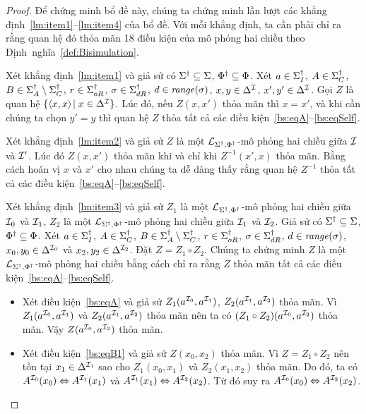 \begin{proof}
	Để chứng minh bổ đề này, chúng ta chứng minh lần lượt các khẳng định~\ref{lm:item1}--\ref{lm:item4} của bổ đề. Với mỗi khẳng định, ta cần phải chỉ ra rằng quan hệ đó thỏa mãn 18 điều kiện của mô phỏng hai chiều theo Định~nghĩa~\ref{def:Bisimulation}.
	
	\semiItem Xét khẳng định~\eqref{lm:item1} và giả sử có $\Sigma^\dag \subseteq \Sigma$, $\Phi^\dag \subseteq \Phi$. Xét $a \in \Sigma^\dag_I$, $A \in \Sigma^\dag_C$, $B \in \Sigma^\dag_A\setminus\Sigma^\dag_C$, $r \in \Sigma^\dag_{oR}$, $\sigma \in \Sigma^\dag_{dR}$, $d \in \mathit{range}(\sigma)$, $x,y \in \Delta^{\mathcal{I}}$, $x',y' \in \Delta^{\mathcal{I}}$.
	Gọi $Z$ là quan hệ $\{\left\langle x,x\right\rangle\! \mid x \in \Delta^{\mathcal{I}}\}$. Lúc đó, nếu $Z(x, x')$ thỏa mãn thì $x = x'$, và khi cần chúng ta chọn $y' = y$ thì quan hệ $Z$ thỏa tất cả các điều kiện~\eqref{bs:eqA}--\eqref{bs:eqSelf}.
	
	\semiItem Xét khẳng định~\eqref{lm:item2} và giả sử $Z$ là một $\mathcal{L}_{\Sigma^\dag,\Phi^\dag}$-mô phỏng hai chiều giữa $\mathcal{I}$ và $\mathcal{I}'$. Lúc đó $Z(x, x')$ thỏa mãn khi và chỉ khi $Z^{-1}(x', x)$ thỏa mãn. Bằng cách hoán vị $x$ và $x'$ cho nhau chúng ta dễ dàng thấy rằng quan hệ $Z^{-1}$ thỏa tất cả các điều kiện~\eqref{bs:eqA}--\eqref{bs:eqSelf}.
	
	\semiItem Xét khẳng định~\eqref{lm:item3} và giả sử $Z_1$ là một $\mathcal{L}_{\Sigma^\dag,\Phi^\dag}$-mô phỏng hai chiều giữa $\mathcal{I}_0$ và $\mathcal{I}_1$, $Z_2$ là một $\mathcal{L}_{\Sigma^\dag,\Phi^\dag}$-mô phỏng hai chiều giữa $\mathcal{I}_1$ và $\mathcal{I}_2$.
	Giả sử có $\Sigma^\dag \subseteq \Sigma$, $\Phi^\dag \subseteq \Phi$. Xét $a \in \Sigma^\dag_I$, $A \in \Sigma^\dag_C$, $B \in \Sigma^\dag_A\setminus\Sigma^\dag_C$, $r \in \Sigma^\dag_{oR}$, $\sigma \in \Sigma^\dag_{dR}$, $d \in \mathit{range}(\sigma)$, $x_0,y_0 \in \Delta^{\mathcal{I}_0}$ và $x_2,y_2 \in \Delta^{\mathcal{I}_2}$. Đặt $Z = Z_1 \circ Z_2$. Chúng ta chứng minh $Z$ là một $\mathcal{L}_{\Sigma^\dag,\Phi^\dag}$-mô phỏng hai chiều bằng cách chỉ ra rằng $Z$ thỏa mãn tất cả các điều kiện~\eqref{bs:eqA}--\eqref{bs:eqSelf}.
	
	\begin{itemize}
		\item Xét điều kiện~\eqref{bs:eqA} và giả sử $Z_1(a^{\mathcal{I}_0}, a^{\mathcal{I}_1})$, $Z_2(a^{\mathcal{I}_1}, a^{\mathcal{I}_2})$ thỏa mãn. Vì $Z_1(a^{\mathcal{I}_0}, a^{\mathcal{I}_1})$ và $Z_2(a^{\mathcal{I}_1}, a^{\mathcal{I}_2})$ thỏa mãn nên ta có $(Z_1 \circ Z_2)(a^{\mathcal{I}_0}, a^{\mathcal{I}_2})$ thỏa mãn. Vậy $Z(a^{\mathcal{I}_0}, a^{\mathcal{I}_2})$ thỏa mãn.
	
		\item Xét điều kiện~\eqref{bs:eqB1} và giả sử $Z(x_0, x_2)$ thỏa mãn. Vì $Z = Z_1 \circ Z_2$ nên tồn tại $x_1 \in \Delta^{\mathcal{I}_1}$ sao cho $Z_1(x_0, x_1)$ và $Z_2(x_1, x_2)$ thỏa mãn. Do đó, ta có $A^{\mathcal{I}_0}(x_0) \Leftrightarrow A^{\mathcal{I}_1}(x_1)$ và $A^{\mathcal{I}_1}(x_1) \Leftrightarrow A^{\mathcal{I}_2}(x_2)$. Từ đó suy ra $A^{\mathcal{I}_0}(x_0) \Leftrightarrow A^{\mathcal{I}_2}(x_2)$.
	

\end{itemize}
\end{proof}
